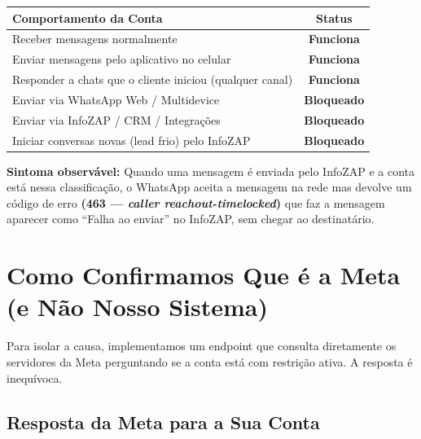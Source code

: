 \documentclass[12pt, a4paper]{article}
\begin{document}
\begin{table}[H]
    \centering
    \renewcommand{\arraystretch}{1.4}
    \begin{tabularx}{\textwidth}{X c}
        \toprule
        \rowcolor{tableHeader} \textbf{Comportamento da Conta} & \textbf{Status} \\
        \midrule
        Receber mensagens normalmente & \textcolor{successGreen}{\textbf{Funciona}} \\
        \rowcolor{lightGray}
        Enviar mensagens pelo aplicativo no celular & \textcolor{successGreen}{\textbf{Funciona}} \\
        Responder a chats que o cliente iniciou (qualquer canal) & \textcolor{successGreen}{\textbf{Funciona}} \\
        \rowcolor{lightGray}
        Enviar via WhatsApp Web / Multidevice & \textcolor{accentColor}{\textbf{Bloqueado}} \\
        Enviar via InfoZAP / CRM / Integrações & \textcolor{accentColor}{\textbf{Bloqueado}} \\
        \rowcolor{lightGray}
        Iniciar conversas novas (lead frio) pelo InfoZAP & \textcolor{accentColor}{\textbf{Bloqueado}} \\
        \bottomrule
    \end{tabularx}
\end{table}

\textcolor{accentColor}{\textbf{Sintoma observável:}} Quando uma mensagem é enviada pelo InfoZAP e a conta está nessa classificação, o WhatsApp aceita a mensagem na rede mas devolve um código de erro \textbf{(463 --- \textit{caller reachout-timelocked})} que faz a mensagem aparecer como ``Falha ao enviar'' no InfoZAP, sem chegar ao destinatário.

\needspace{8cm}

\section{Como Confirmamos Que é a Meta (e Não Nosso Sistema)}

Para isolar a causa, implementamos um endpoint que consulta diretamente os servidores da Meta perguntando se a conta está com restrição ativa. A resposta é inequívoca.

\subsection{Resposta da Meta para a Sua Conta}
\end{document}
